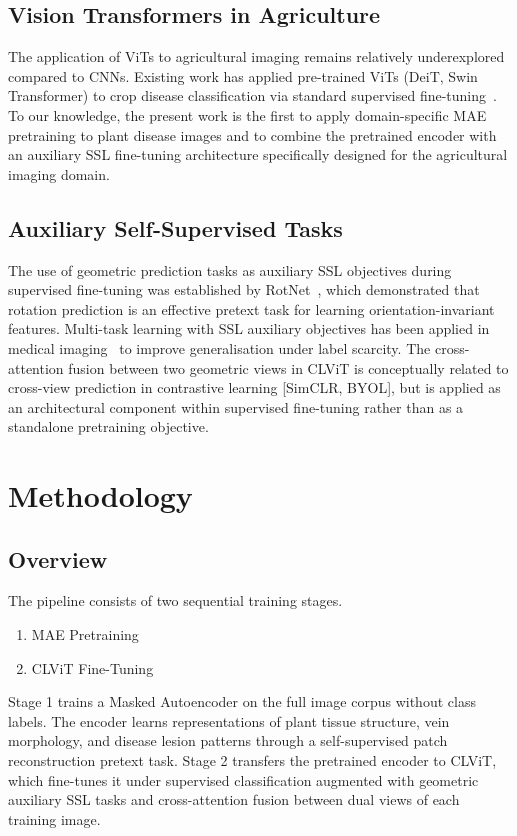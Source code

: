 \documentclass[conference]{IEEEtran}
\begin{document}
\subsection{Vision Transformers in Agriculture}

The application of ViTs to agricultural imaging remains relatively underexplored compared to CNNs. Existing work has applied pre-trained ViTs (DeiT, Swin Transformer) to crop disease classification via standard supervised fine-tuning~\cite{21}. To our knowledge, the present work is the first to apply domain-specific MAE pretraining to plant disease images and to combine the pretrained encoder with an auxiliary SSL fine-tuning architecture specifically designed for the agricultural imaging domain.

\subsection{Auxiliary Self-Supervised Tasks}

The use of geometric prediction tasks as auxiliary SSL objectives during supervised fine-tuning was established by RotNet~\cite{10}, which demonstrated that rotation prediction is an effective pretext task for learning orientation-invariant features. Multi-task learning with SSL auxiliary objectives has been applied in medical imaging~\cite{22} to improve generalisation under label scarcity. The cross-attention fusion between two geometric views in CLViT is conceptually related to cross-view prediction in contrastive learning [SimCLR, BYOL], but is applied as an architectural component within supervised fine-tuning rather than as a standalone pretraining objective.

\section{Methodology}

\subsection{Overview}
The pipeline consists of two sequential training stages.
\begin{enumerate}
\item MAE Pretraining
\item CLViT Fine-Tuning
\end{enumerate}
Stage 1 trains a Masked Autoencoder on the full image corpus without class labels. The encoder learns representations of plant tissue structure, vein morphology, and disease lesion patterns through a self-supervised patch reconstruction pretext task. Stage 2 transfers the pretrained encoder to CLViT, which fine-tunes it under supervised classification augmented with geometric auxiliary SSL tasks and cross-attention fusion between dual views of each training image.
\end{document}
